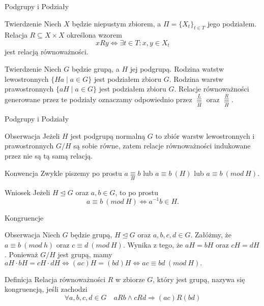 \documentclass{beamer}
\begin{document}
\begin{frame}{Podgrupy i Podziały}
    \begin{block}{Twierdzenie}
        Niech $X$ będzie niepustym zbiorem, a $\varPi = \{X_t\}_{t \in T}$ jego podziałem. Relacja
        $R \subseteq X \times X$ określona wzorem 
        $$xRy \Leftrightarrow  \exists t \in T : x,y \in X_t$$
        jest relacją równoważności.
    \end{block}
    \pause
    \begin{block}{Twierdzenie}
        Niech $G$ będzie grupą, a $H$ jej podgrupą. Rodzina watstw lewostronnych $\{Ha \mid a \in G\}$ jest podziałem zbioru $G$.
        Rodzina warstw prawostronnych $\{aH \mid a \in G\}$ jest podziałem zbioru $G$. Relacje równoważności generowane przez te podziały 
        oznaczamy odpowiednio przez $\underset{H}{\stackrel{L}{\equiv}}$ oraz $\underset{H}{\stackrel{R}{\equiv}}$.
    \end{block}
\end{frame}

\begin{frame}{Podgrupy i Podziały}
    \begin{alertblock}{Obserwacja}
        Jeżeli $H$ jest podgrupą normalną $G$ to zbiór warstw lewostronnych i prawostronnych $G/H$ są sobie równe, zatem relacje równoważności
        indukowane przez nie są tą samą relacją.
    \end{alertblock}
    \begin{alertblock}{Konwencja}
        Zwykle piszemy po prostu $a \underset{H}{\equiv} b$ lub $a \equiv b \  (H)$ lub $a \equiv b \ (mod \ H)$. 
    \end{alertblock}
    \begin{alertblock}{Wniosek}
        Jeżeli $H \trianglelefteq G$ oraz $a,b \in G$, to po prostu 
        $$ a \equiv b \ (mod \ H) \Leftrightarrow a^{-1}b \in H.$$
    \end{alertblock}
\end{frame}

\begin{frame}{Kongruencje}
    \begin{alertblock}{Obserwacja}
        Niech $G$ będzie grupą, $H \trianglelefteq G$ oraz $a,b,c,d \in G$. Załóżmy, że $a \equiv b \ (mod \ h )$
        oraz $c \equiv d \ (mod \ H)$. Wynika z tego, że $aH = bH$ oraz $cH = dH$. Ponieważ $G/H$ jest grupą, mamy
        $aH \cdot bH = cH \cdot dH \Leftrightarrow (ac)H = (bd)H \Leftrightarrow ac \equiv bd \ (mod \ H).$
    \end{alertblock}
    \pause 
    \begin{block}{Definicja}
        Relacja równoważności $R$ w zbiorze $G$, który jest grupą, nazywa się \alert{kongruencją}, jeśli zachodzi 
        $$\forall a,b,c,d \in G \quad aRb \land cRd \Rightarrow (ac) R(bd) $$
    \end{block}
\end{frame}
\end{document}
